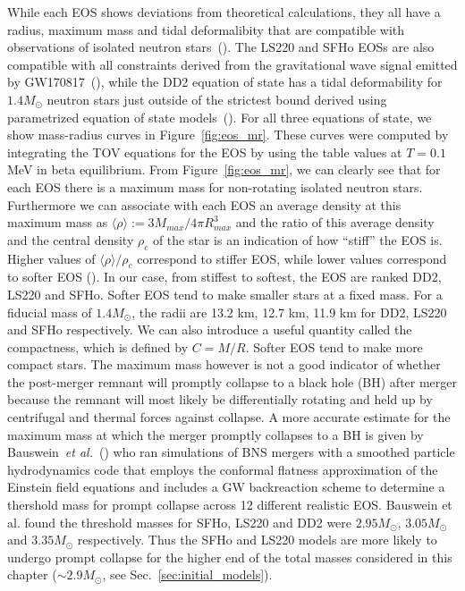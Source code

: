 While each EOS shows deviations from theoretical calculations, they all have a radius, maximum mass and tidal deformalibity that are compatible with observations of isolated neutron stars~(\citet*{demorest:2010bx,hempel2017well}). The LS220 and SFHo EOSs are also compatible with all constraints derived from the gravitational wave signal emitted by GW170817~(\citet*{gw170817-pe,gw170817-nsradius}), while the DD2 equation of state has a tidal deformability for $1.4M_\odot$ neutron stars just outside of the strictest bound derived using parametrized equation of state models~(\citet*{gw170817-nsradius}). For all three equations of state, we show mass-radius curves in Figure~\ref{fig:eos_mr}. These curves were computed by integrating the TOV equations for the EOS by using the table values at $T=0.1$\,MeV in beta equilibrium. From Figure~\ref{fig:eos_mr}, we can clearly see that for each EOS there is a maximum mass for non-rotating isolated neutron stars. Furthermore we can associate with each EOS an average density at this maximum mass as $\langle \rho \rangle := 3M_{max}/4\pi R^3_{max}$ and the ratio of this average density and the central density $\rho_c$ of the star is an indication of how ``stiff'' the EOS is. Higher values of $\langle \rho \rangle/\rho_c$ correspond to stiffer EOS, while lower values correspond to softer EOS (\citet*{bauswein2013prompt}). In our case, from stiffest to softest, the EOS are ranked DD2, LS220 and SFHo. Softer EOS tend to make smaller stars at a fixed mass. For a fiducial mass of $1.4M_\odot$, the radii are 13.2 km, 12.7 km, 11.9 km for DD2, LS220 and SFHo respectively. We can also introduce a useful quantity called the compactness, which is defined by $C=M/R$. Softer EOS tend to make more compact stars. The maximum mass however is not a good indicator of whether the post-merger remnant will promptly collapse to a black hole (BH) after merger because the remnant will most likely be differentially rotating and held up by centrifugal and thermal forces against collapse.
A more accurate estimate for the maximum mass at which the merger promptly collapses to a BH is given by Bauswein~{\it et al.}~(\citet*{bauswein2013prompt}) who ran simulations of BNS mergers with a smoothed particle hydrodynamics code that employs the conformal flatness approximation of the Einstein field equations and includes a GW backreaction scheme to determine a thershold mass for prompt collapse across 12 different realistic EOS. Bauswein et al. found the threshold masses for SFHo, LS220 and DD2 were $2.95M_\odot$, $3.05M_\odot$ and $3.35M_\odot$ respectively. Thus the SFHo and LS220 models are more likely to undergo prompt collapse for the higher end of the total masses considered in this chapter ($\sim 2.9M_\odot$, see Sec.~\ref{sec:initial_models}). 

